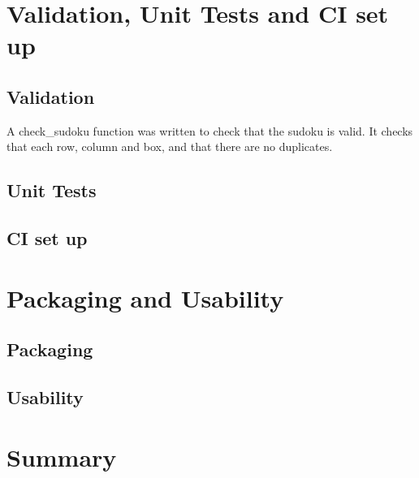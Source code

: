 \documentclass[12pt]{report} %
\begin{document}
\chapter{Validation, Unit Tests and CI set up}

\section{Validation}

A check\_sudoku function was written to check that the sudoku is valid. It checks that each row, column and box, and that there are no duplicates.

\section{Unit Tests}

\section{CI set up}

\chapter{Packaging and Usability}

\section{Packaging}

\section{Usability}


\chapter{Summary}



\end{document}
